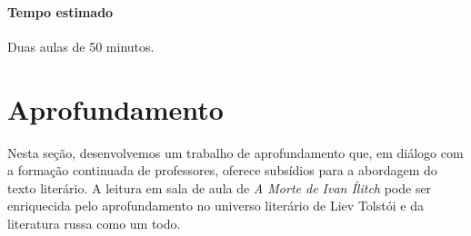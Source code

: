 \documentclass[12pt]{extarticle}
\begin{document}
\paragraph{Tempo estimado} Duas aulas de 50 minutos.


\section{Aprofundamento}


\begin{comment}
Ao chegar ao Ensino Médio, é necessário que os estudantes se aprofundem
na compreensão das múltiplas linguagens e, sobretudo, da linguagem
literária. Em relação à literatura, a BNCC traz as seguintes
considerações:


\begin{quote}
{[}...{]} a leitura do texto literário, que ocupa o centro do trabalho
no Ensino Fundamental, deve permanecer nuclear também no Ensino Médio.
Por força de certa simplificação didática, as biografias de autores, as
características de épocas, os resumos e outros gêneros artísticos
substitutivos, como o cinema e as HQs, têm relegado o texto literário a
um plano secundário do ensino. Assim, é importante não só (re)colocá-lo
como ponto de partida para o trabalho com a literatura, como
intensificar seu convívio com os estudantes. Como linguagem
artisticamente organizada, a literatura enriquece nossa percepção e
nossa visão de mundo. Mediante arranjos especiais das palavras, ela cria
um universo que nos permite aumentar nossa capacidade de ver e sentir.
Nesse sentido, a literatura possibilita uma ampliação da nossa visão do
mundo, ajuda-nos não só a ver mais, mas a colocar em questão muito do
que estamos vendo/vivenciando. (Brasil, 2018, p. 491)
\end{quote}
\end{comment}

Nesta seção, desenvolvemos um trabalho de aprofundamento que, em diálogo
com a formação continuada de professores, oferece subsídios para a
abordagem do texto literário. A leitura em sala de aula de \emph{A Morte
de Ivan Ílitch} pode ser enriquecida pelo aprofundamento no universo
literário de Liev Tolstói e da literatura russa como um todo.


\end{document}
